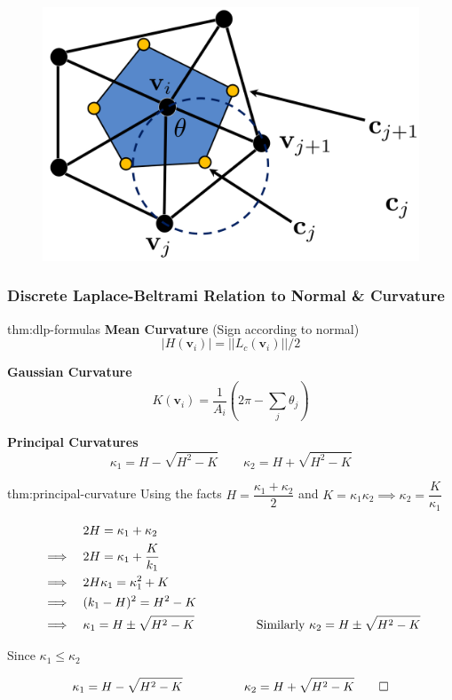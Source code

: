 \documentclass{article}
\begin{document}
\begin{figure}[!ht]
    \centering
    \includegraphics[width=0.3\linewidth]{images/cotangent_weights_area.png}
\end{figure}

\newpage

\subsubsection{Discrete Laplace-Beltrami Relation to Normal \& Curvature}

\begin{defin}{thm:dlp-formulas}
    \textbf{Mean Curvature} (Sign according to normal)
    \[
        |H(\mathbf{v}_{i})| = ||L_{c}(\mathbf{v}_{i})||/2
    \]

    \textbf{Gaussian Curvature}
    \[
        K(\mathbf{v}_{i}) = \frac{1}{A_{i}} \left(2\pi - \sum_{j} \theta_{j}\right)
    \]

    \textbf{Principal Curvatures}
    \vspace{5px}
    \[
        \kappa_{1} = H - \sqrt{H^{2} - K} \qquad \kappa_{2} = H + \sqrt{H^{2}-K}
    \]
\end{defin}

\begin{prf}{thm:principal-curvature}
    Using the facts \(H = \dfrac{\kappa_1+\kappa_2}{2}\) and \(K=\kappa_1 \kappa_2 \implies \kappa_2 = \dfrac{K}{\kappa_1}\)

    \begin{alignat*}{2}
        &\phantom{\implies} &&2H = \kappa_{1} + \kappa_{2}\\
        &\implies &&2H = \kappa_{1} + \frac{K}{k_1}\\
        &\implies &&2H\kappa_{1} = \kappa_{1}^2+K\\
        &\implies &&(k_{1}-H)^2 = H^2 -K\\
        &\implies &&\kappa_{1} = H \pm \sqrt{H^2 - K} \hspace{50px} \text{Similarly } \kappa_{2} = H \pm \sqrt{H^2 - K}
    \end{alignat*}

    Since \(\kappa_{1} \leq \kappa_{2}\)

    \[
        \kappa_{1} = H - \sqrt{H^2 - K} \hspace{50px} \kappa_{2} = H + \sqrt{H^2 - K} \qquad \square
    \]
    
\end{prf}
\end{document}
